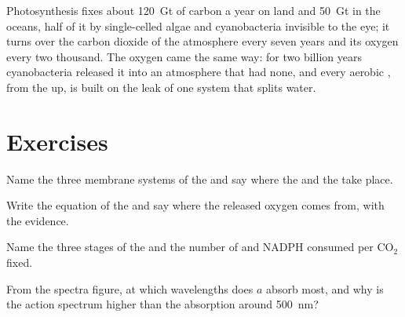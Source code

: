 \begin{example}\label{ex:b1:photosynthesis:global}
Photosynthesis fixes about \qty{120}{Gt} of carbon a year on land and
\qty{50}{Gt} in the oceans, half of it by single-celled algae and
cyanobacteria invisible to the eye; it turns over the carbon dioxide
of the atmosphere every seven years and its oxygen every two thousand.
The oxygen came the same way: for two billion years cyanobacteria
released it into an atmosphere that had none, and every aerobic
, from the  up, is built on the leak of one
 system that splits water.
\end{example}

\section{Exercises}

\begin{exercise}[$\star$]\label{exo:b1:photosynthesis:1}
Name the three membrane systems of the  and say where the
 and the  take place.
\end{exercise}

\begin{exercise}[$\star$]\label{exo:b1:photosynthesis:2}
Write the equation of the  and say where the released
oxygen comes from, with the evidence.
\end{exercise}

\begin{exercise}[$\star$]\label{exo:b1:photosynthesis:3}
Name the three stages of the  and the number of  and
NADPH consumed per $\mathrm{CO_2}$ fixed.
\end{exercise}

\begin{exercise}[$\star$]\label{exo:b1:photosynthesis:4}
From the spectra figure, at which wavelengths does  $a$
absorb most, and why is the action spectrum higher than the
 absorption around \qty{500}{nm}?
\end{exercise}

